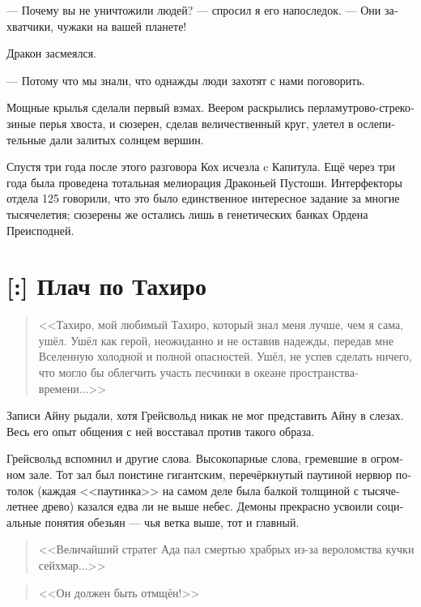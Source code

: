 \documentclass[a4paper,12pt,fleqn]{book}\usepackage{polyglossia}\setdefaultlanguage[babelshorthands=true]{russian}\setotherlanguage{english}\defaultfontfeatures{Ligatures=TeX,Mapping=tex-text}\usepackage{xcolor}\newcommand{\ml}[3]{#2}
\newcommand{\asterism}{\vspace{1em}{\centering\Large\bfseries$\ast~\ast~\ast$\par}\vspace{1em}}
\newcommand{\textspace}{\vspace{1em}{\centering\Large\bfseries<...>\par}\vspace{1em}}
\begin{document}
--- Почему вы не уничтожили людей? --- спросил я его напоследок.
--- Они захватчики, чужаки на вашей планете!

Дракон засмеялся.

--- Потому что мы знали, что однажды люди захотят с нами поговорить.

Мощные крылья сделали первый взмах.
Веером раскрылись перламутрово-стрекозиные перья хвоста, и сюзерен, сделав величественный круг, улетел в ослепительные дали залитых солнцем вершин.

\asterism

Спустя три года после этого разговора Кох исчезла c Капитула.
Ещё через три года была проведена тотальная мелиорация Драконьей Пустоши.
Интерфекторы отдела 125 говорили, что это было единственное интересное задание за многие тысячелетия;
сюзерены же остались лишь в генетических банках Ордена Преисподней.

\section{[:] Плач по Тахиро}

\textspace

\begin{quote}
<<Тахиро, мой любимый Тахиро, который знал меня лучше, чем я сама, ушёл.
Ушёл как герой, неожиданно и не оставив надежды, передав мне Вселенную холодной и полной опасностей.
Ушёл, не успев сделать ничего, что могло бы облегчить участь песчинки в океане пространства-времени...>>
\end{quote}

Записи Айну рыдали, хотя Грейсвольд никак не мог представить Айну в слезах.
Весь его опыт общения с ней восставал против такого образа.

Грейсвольд вспомнил и другие слова.
Высокопарные слова, гремевшие в огромном зале.
Тот зал был поистине гигантским, перечёркнутый паутиной нервюр потолок (каждая <<паутинка>> на самом деле была балкой толщиной с тысячелетнее древо) казался едва ли не выше небес.
Демоны прекрасно усвоили социальные понятия обезьян --- чья ветка выше, тот и главный.

\begin{quote}
<<Величайший стратег Ада пал смертью храбрых из-за вероломства кучки сейхмар...>>
\end{quote}

\begin{quote}
<<Он должен быть отмщён!>>
\end{quote}
\end{document}
